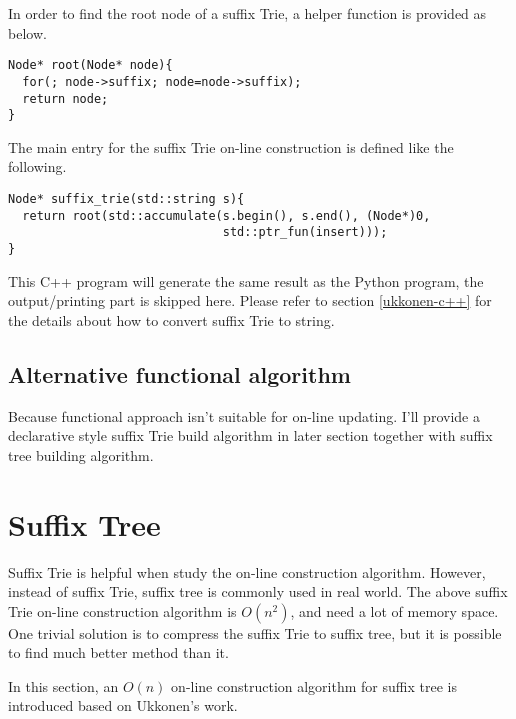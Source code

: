 \documentclass{article}
\begin{document}
In order to find the root node of a suffix Trie, a helper function
is provided as below.

\begin{lstlisting}
Node* root(Node* node){
  for(; node->suffix; node=node->suffix);
  return node;
}
\end{lstlisting}

The main entry for the suffix Trie on-line construction is
defined like the following.

\begin{lstlisting}
Node* suffix_trie(std::string s){
  return root(std::accumulate(s.begin(), s.end(), (Node*)0, 
                              std::ptr_fun(insert)));
}
\end{lstlisting}

This C++ program will generate the same result as the Python
program, the output/printing part is skipped here. Please
refer to section \ref{ukkonen-c++} for the details about how
to convert suffix Trie to string.

\subsection{Alternative functional algorithm}
Because functional approach isn't suitable for on-line updating.
I'll provide a declarative style suffix Trie build algorithm in later
section together with suffix tree building algorithm.


\section{Suffix Tree} 

Suffix Trie is helpful when study the on-line construction algorithm.
However, instead of suffix Trie, suffix tree is commonly used in real world.
The above suffix Trie on-line construction algorithm is $O(n^2)$, and 
need a lot of memory space. One trivial solution is to compress the 
suffix Trie to suffix tree\cite{trivial-stree-java}, but it is possible
to find much better method than it.

In this section, an $O(n)$ on-line construction
algorithm for suffix tree is introduced based on Ukkonen's work\cite{ukkonen95}.

\end{document}
